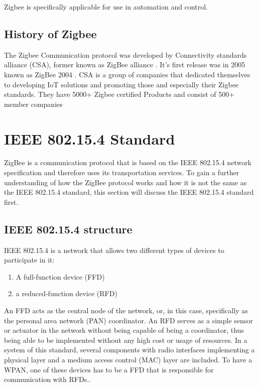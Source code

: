 \documentclass[conference]{IEEEtran}
\begin{document}
Zigbee is specifically applicable for use in automation and control.


\subsection{History of Zigbee}
The Zigbee Communication protocol was developed by Connectivity standards alliance (CSA), former known as ZigBee alliance \cite{CSAofficial}. It's first release was in 2005 known as ZigBee 2004 \cite{DrahtlosZigbee}. CSA is a group of companies that dedicated themselves to developing IoT solutions and promoting those and especially their Zigbee standards. They have 5000+ Zigbee certified Products and consist of 500+ member companies \cite{CSAofficial}

\section{IEEE 802.15.4 Standard}

ZigBee is a communication protocol that is based on the IEEE 802.15.4 network specification and therefore uses its transportation services. To gain a further understanding of how the ZigBee protocol works and how it is not the same as the IEEE 802.15.4 standard, this section will discuss the IEEE 802.15.4 standard first\cite{StudyForZigbee}.


\subsection{IEEE 802.15.4 structure}

IEEE 802.15.4 is a network that allows two different types of devices to participate in it\cite{2020Standard}:\\

\begin{enumerate}
    \item A full-function device (FFD)
    \item a reduced-function device (RFD)\\
    
\end{enumerate}

An FFD acts as the central node of the network, or, in this case, specifically as the personal area network (PAN) coordinator. An RFD serves as a simple sensor or actuator in the network without being capable of being a coordinator, thus being able to be implemented without any high cost or usage of resources. In a system of this standard, several components with radio interfaces implementing a physical layer and a medium access control (MAC) layer are included. To have a WPAN, one of these devices has to be a FFD that is responsible for communication with RFDs.\cite{2020Standard}.
\end{document}
